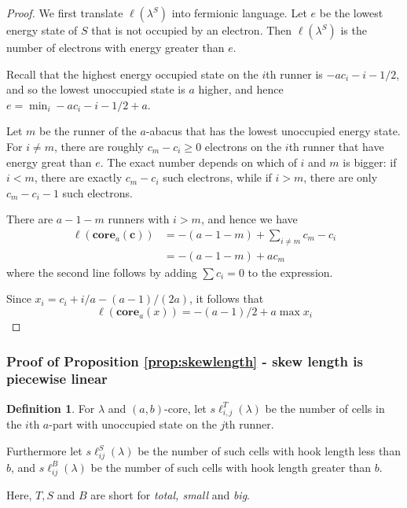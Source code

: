 \documentclass{amsart}[12pt]
\theoremstyle{definition}
\newtheorem{definition}[dummy]{Definition}
\newcommand{\core}{\mathbf{core}}
\newcommand{\sk}{s\ell}
\begin{document}
\begin{proof}
We first translate $\ell(\lambda^S)$ into fermionic language.
Let $e$ be the lowest energy state of $S$ that is not occupied by an electron.  Then $\ell(\lambda^S)$ is the number of electrons with energy greater than $e$.

Recall that the highest energy occupied state on the $i$th runner is $-ac_i-i-1/2$, and so the lowest unoccupied state is $a$ higher, and hence $e=\min_i -ac_i-i-1/2+a$.  

Let $m$ be the runner of the $a$-abacus that has the lowest unoccupied energy state.  For $i\neq m$, there are roughly $c_m-c_i\geq 0 $ electrons on the $i$th runner that have energy great than $e$.  The exact number depends  on which of $i$ and $m$ is bigger: if $i<m$, there are exactly $c_m-c_i$ such electrons, while if $i>m$, there are only $c_m-c_i-1$ such electrons. 

 There are $a-1-m$ runners with $i>m$, and hence we have
\begin{align*}
\ell(\core_a(\mathbf{c})) & =-(a-1-m)+\sum_{i\neq m} c_m-c_i \\
 &=-(a-1-m)+ac_m
 \end{align*}
 where the second line follows by adding $\sum c_i=0$ to the expression.

Since $x_i=c_i+i/a-(a-1)/(2a)$, it follows that
$$
\ell(\core_a(x))= -(a-1)/2+a\max x_i 
$$

\end{proof}





\subsubsection{Proof of Proposition \ref{prop:skewlength} - skew length is piecewise linear}





\begin{definition} \label{def:skewij}
For $\lambda$ and $(a,b)$-core, let $\sk^T_{i,j}(\lambda)$ be the number of cells in the $i$th $a$-part with unoccupied state on the $j$th runner.

Furthermore let $\sk_{ij}^S(\lambda)$ be the number of such cells with hook length less than $b$, and $\sk_{ij}^B(\lambda)$ be the number of such cells with hook length greater than $b$.
 
Here, $T, S$ and $B$ are short for \emph{total, small} and \emph{big}.
\end{definition}
\end{document}
